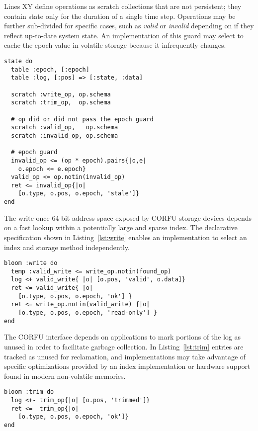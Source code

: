 Lines XY define operations as scratch collections that are not persistent;
they contain state only for the duration of a single time step. Operations may
be further sub-divided for specific cases, such as \emph{valid} or
\emph{invalid} depending on if they reflect up-to-date system state.
An implementation of this guard may select to cache the epoch value in
volatile storage because it infrequently changes.

\begin{lstlisting}[caption={State Declaration}, label=lst:state]
state do
  table :epoch, [:epoch]
  table :log, [:pos] => [:state, :data]

  scratch :write_op, op.schema
  scratch :trim_op,  op.schema

  # op did or did not pass the epoch guard
  scratch :valid_op,   op.schema
  scratch :invalid_op, op.schema

  # epoch guard
  invalid_op <= (op * epoch).pairs{|o,e|
    o.epoch <= e.epoch}
  valid_op <= op.notin(invalid_op)
  ret <= invalid_op{|o|
    [o.type, o.pos, o.epoch, 'stale']}
end
\end{lstlisting}

The write-once 64-bit address space exposed by CORFU storage devices depends
on a fast lookup within a potentially large and sparse index. The declarative
specification shown in Listing~\ref{lst:write} enables an implementation to
select an index and storage method independently.

\begin{lstlisting}[caption={Write}, label=lst:write]
bloom :write do
  temp :valid_write <= write_op.notin(found_op)
  log <+ valid_write{ |o| [o.pos, 'valid', o.data]}
  ret <= valid_write{ |o|
    [o.type, o.pos, o.epoch, 'ok'] }
  ret <= write_op.notin(valid_write) {|o|
    [o.type, o.pos, o.epoch, 'read-only'] }
end
\end{lstlisting}

The CORFU interface depends on applications to mark portions of the log as
unused in order to facilitate garbage collection.  In Listing~\ref{lst:trim}
entries are tracked as unused for reclamation, and implementations may take
advantage of specific optimizations provided by an index implementation or
hardware support found in modern non-volatile memories.

\begin{lstlisting}[caption={Trim}, label=lst:trim]
bloom :trim do
  log <+- trim_op{|o| [o.pos, 'trimmed']}
  ret <=  trim_op{|o|
    [o.type, o.pos, o.epoch, 'ok']}
end
\end{lstlisting}

